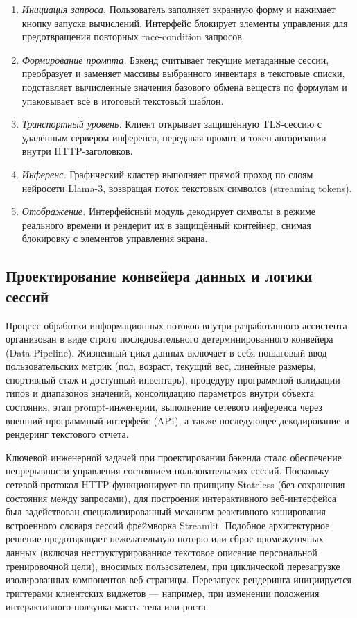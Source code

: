 \documentclass[14pt, a4paper]{extarticle}
\begin{document}
\begin{enumerate}
    \item \textit{Инициация запроса.} Пользователь заполняет экранную форму и нажимает кнопку запуска вычислений. Интерфейс блокирует элементы управления для предотвращения повторных race-condition запросов.
    \item \textit{Формирование промпта.} Бэкенд считывает текущие метаданные сессии, преобразует и заменяет массивы выбранного инвентаря в текстовые списки, подставляет вычисленные значения базового обмена веществ по формулам и упаковывает всё в итоговый текстовый шаблон.
    \item \textit{Транспортный уровень.} Клиент открывает защищённую TLS-сессию с удалённым сервером инференса, передавая промпт и токен авторизации внутри HTTP-заголовков.
    \item \textit{Инференс.} Графический кластер выполняет прямой проход по слоям нейросети Llama-3, возвращая поток текстовых символов (streaming tokens).
    \item \textit{Отображение.} Интерфейсный модуль декодирует символы в режиме реального времени и рендерит их в защищённый контейнер, снимая блокировку с элементов управления экрана.
\end{enumerate}

\subsection{Проектирование конвейера данных и логики сессий}

Процесс обработки информационных потоков внутри разработанного ассистента организован в виде строго последовательного детерминированного конвейера (Data Pipeline). Жизненный цикл данных включает в себя пошаговый ввод пользовательских метрик (пол, возраст, текущий вес, линейные размеры, спортивный стаж и доступный инвентарь), процедуру программной валидации типов и диапазонов значений, консолидацию параметров внутри объекта состояния, этап prompt-инженерии, выполнение сетевого инференса через внешний программный интерфейс (API), а также последующее декодирование и рендеринг текстового отчета.

Ключевой инженерной задачей при проектировании бэкенда стало обеспечение непрерывности управления состоянием пользовательских сессий. Поскольку сетевой протокол HTTP функционирует по принципу Stateless (без сохранения состояния между запросами), для построения интерактивного веб-интерфейса был задействован специализированный механизм реактивного кэширования встроенного словаря сессий фреймворка Streamlit. Подобное архитектурное решение предотвращает нежелательную потерю или сброс промежуточных данных (включая неструктурированное текстовое описание персональной тренировочной цели), вносимых пользователем, при циклической перезагрузке изолированных компонентов веб-страницы. Перезапуск рендеринга инициируется триггерами клиентских виджетов — например, при изменении положения интерактивного ползунка массы тела или роста.
\end{document}
